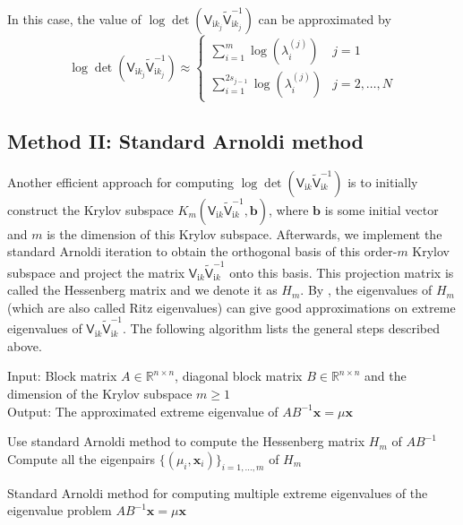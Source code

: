 In this case, the value of 
$\log\det(\mathsf{V}_{\mathrm{i}k_{j}}\tilde{\mathsf{V}}_{\mathrm{i}k_{j}}^{-1})$ can be approximated by 
\begin{equation}
    \log\det(\mathsf{V}_{\mathrm{i}k_{j}}\tilde{\mathsf{V}}_{\mathrm{i}k_{j}}^{-1})  \approx
      \begin{cases}
        \sum_{i = 1}^{m} \log\left(\lambda_{i}^{(j)}\right) & j = 1\\
        \sum_{i = 1}^{2s_{j-1}} \log\left(\lambda_{i}^{(j)}\right) & j = 2, \dots, N
      \end{cases}       
  \end{equation}

\subsection{Method II: Standard Arnoldi method}
Another efficient approach for computing $\log\det(\mathsf{V}_{\mathrm{i}k}\tilde{\mathsf{V}}_{\mathrm{i}k}^{-1})$ is to initially construct the Krylov subspace  
$K_{m}(\mathsf{V}_{\mathrm{i}k}\tilde{\mathsf{V}}_{\mathrm{i}k}^{-1}, \boldsymbol{b})$, where $\boldsymbol{b}$ is some 
initial vector and $m$ is the dimension of this Krylov subspace. Afterwards, we implement the standard Arnoldi iteration to obtain the orthogonal basis of 
this order-$m$ Krylov subspace and project the matrix $\mathsf{V}_{\mathrm{i}k}\tilde{\mathsf{V}}_{\mathrm{i}k}^{-1}$ onto this basis. 
This projection matrix is called the Hessenberg matrix and we denote it as $H_{m}$. By \cite{saad2011numerical}, the eigenvalues of $H_{m}$ (which are also 
called Ritz eigenvalues) can give good approximations on extreme eigenvalues of $\mathsf{V}_{\mathrm{i}k}\tilde{\mathsf{V}}_{\mathrm{i}k}^{-1}$.
The following algorithm lists the general steps described above.


\begin{algorithm}[H]
    \SetAlgoLined
    Input: Block matrix $A\in\mathbb{R}^{n\times n}$, diagonal block matrix $B\in\mathbb{R}^{n\times n}$ and the dimension of the Krylov subspace $m\geq 1$\\
    Output: The approximated extreme eigenvalue of $AB^{-1}\boldsymbol{x} = \mu \boldsymbol{x}$\\
    \begin{algorithmic}[1]
        \STATE Use standard Arnoldi method to compute the Hessenberg matrix $H_{m}$ of $AB^{-1}$
        \STATE Compute all the eigenpairs $\{(\mu_{i}, \boldsymbol{x}_{i})\}_{i = 1, \dots, m}$ of $H_{m}$
        \end{algorithmic}
    \caption{Standard Arnoldi method for computing multiple extreme eigenvalues of the eigenvalue problem $AB^{-1}\boldsymbol{x} = \mu\boldsymbol{x}$}
    \label{Alg for arno method}
    \end{algorithm}

